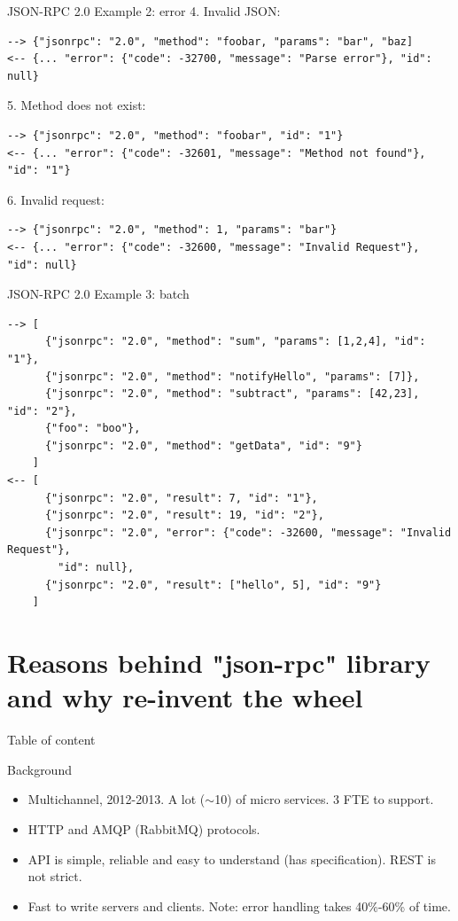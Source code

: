 \documentclass[unicode, notheorems, aspectratio=169]{beamer}
\begin{document}
\begin{frame}[fragile]{JSON-RPC 2.0 Example 2: error}
4. Invalid JSON:
{\small
\begin{verbatim}
--> {"jsonrpc": "2.0", "method": "foobar, "params": "bar", "baz]
<-- {... "error": {"code": -32700, "message": "Parse error"}, "id": null}
\end{verbatim}
}
\vfill
5. Method does not exist:
{\small
\begin{verbatim}
--> {"jsonrpc": "2.0", "method": "foobar", "id": "1"}
<-- {... "error": {"code": -32601, "message": "Method not found"}, "id": "1"}
\end{verbatim}
}
\vfill
6. Invalid request:
{\small
\begin{verbatim}
--> {"jsonrpc": "2.0", "method": 1, "params": "bar"}
<-- {... "error": {"code": -32600, "message": "Invalid Request"}, "id": null}
\end{verbatim}
}
\end{frame}

\begin{frame}[fragile]{JSON-RPC 2.0 Example 3: batch}

{\small
\begin{verbatim}
--> [
      {"jsonrpc": "2.0", "method": "sum", "params": [1,2,4], "id": "1"},
      {"jsonrpc": "2.0", "method": "notifyHello", "params": [7]},
      {"jsonrpc": "2.0", "method": "subtract", "params": [42,23], "id": "2"},
      {"foo": "boo"},
      {"jsonrpc": "2.0", "method": "getData", "id": "9"} 
    ]
<-- [
      {"jsonrpc": "2.0", "result": 7, "id": "1"},
      {"jsonrpc": "2.0", "result": 19, "id": "2"},
      {"jsonrpc": "2.0", "error": {"code": -32600, "message": "Invalid Request"},
        "id": null},
      {"jsonrpc": "2.0", "result": ["hello", 5], "id": "9"}
    ]
\end{verbatim}
}
\end{frame}


\section{Reasons behind "json-rpc" library and why re-invent the wheel}
\begin{frame}{Table of content}
	\tableofcontents[currentsection]
\end{frame}

\begin{frame}{Background}
\begin{itemize}
\item Multichannel, 2012-2013. A lot ($\sim$10) of micro services. 3 FTE to support.
\item HTTP and AMQP (RabbitMQ) protocols.
\item API is simple, reliable and easy to understand (has specification). REST is not strict.
\item Fast to write servers and clients. Note: error handling takes 40\%-60\% of time.
\end{itemize}
\end{frame}
\end{document}
